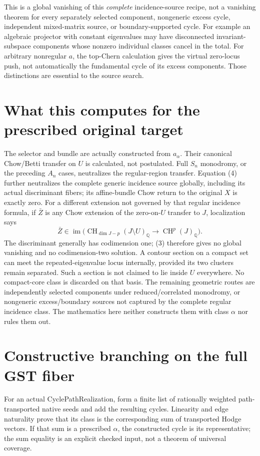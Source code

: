 \documentclass[11pt]{article}
\newcommand{\Q}{\mathbb Q}
\newcommand{\CH}{\operatorname{CH}}
\begin{document}
This is a global vanishing of this \emph{complete} incidence-source recipe,
not a vanishing theorem for every separately selected component, nongeneric
excess cycle, independent mixed-matrix source, or boundary-supported cycle.
For example an algebraic projector with constant eigenvalues may have disconnected invariant-subspace
components whose nonzero individual classes cancel in the total.
For arbitrary nonregular $a$, the top-Chern calculation gives the virtual
zero-locus push, not automatically the fundamental cycle of its excess
components. Those distinctions are essential to the source search.

\section{What this computes for the prescribed original target}
The selector and bundle are actually constructed from $a_\alpha$.
Their canonical Chow/Betti transfer on $U$ is calculated, not postulated.
Full $S_n$ monodromy, or the preceding $A_n$ cases, neutralizes the
regular-region transfer. Equation (4) further neutralizes the complete
generic incidence source globally, including its actual discriminant fibers;
its affine-bundle Chow return to the original $X$ is exactly zero.
For a different extension not governed by that regular incidence formula,
if $\bar Z$ is any Chow extension of
the zero-on-$U$ transfer to $J$, localization says
\[
 \bar Z\in\operatorname{im}\bigl(\CH_{\dim J-p}(J\setminus U)_\Q
       \longrightarrow\CH^p(J)_\Q\bigr).\tag{3}
\]
The discriminant generally has codimension one; (3) therefore gives no
global vanishing and no codimension-two solution. A contour section on a
compact set can meet the repeated-eigenvalue locus internally, provided
its two clusters remain separated. Such a section is not claimed to lie
inside $U$ everywhere. No compact-core class is discarded on that basis.
The remaining geometric routes are independently selected components under
reduced/correlated monodromy, or nongeneric excess/boundary sources not
captured by the complete regular incidence class. The mathematics here
neither constructs them with class
$\alpha$ nor rules them out.

\section{Constructive branching on the full GST fiber}
For an actual CyclePathRealization, form a finite list of rationally
weighted path-transported native seeds and add the resulting cycles.
Linearity and edge naturality prove that its class is the corresponding
sum of transported Hodge vectors. If that sum is a prescribed $\alpha$,
the constructed cycle is its representative; the sum equality is an
explicit checked input, not a theorem of universal coverage.
\end{document}
